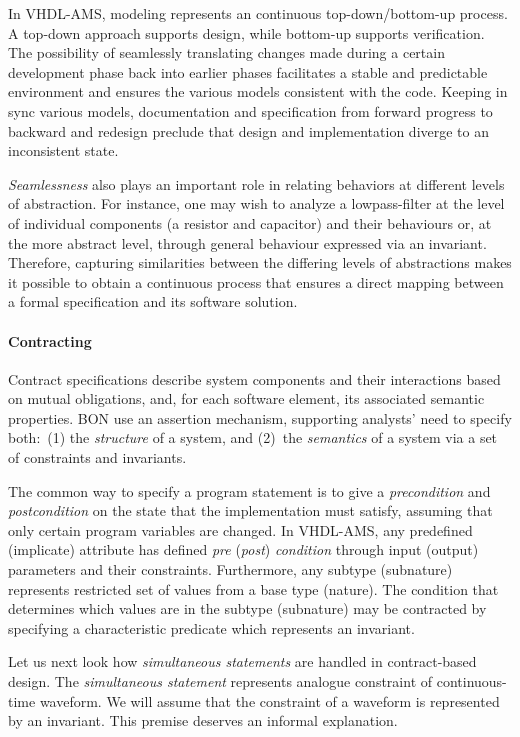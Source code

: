 \documentclass{article}
\begin{document}
In VHDL-AMS, modeling represents an continuous top-down/bottom-up
process.  A top-down approach supports design, while bottom-up
supports verification.  The possibility of seamlessly translating
changes made during a certain development phase back into earlier
phases facilitates a stable and predictable environment and ensures
the various models consistent with the code.  Keeping in sync various
models, documentation and specification from forward progress to
backward and redesign preclude that design and implementation diverge
to an inconsistent state.

\emph{Seamlessness} also plays an important role in relating behaviors
at different levels of abstraction.  For instance, one may wish to
analyze a lowpass-filter at the level of individual components (a
resistor and capacitor) and their behaviours or, at the more abstract
level, through general behaviour expressed via an invariant.
Therefore, capturing similarities between the differing levels of
abstractions makes it possible to obtain a continuous process that
ensures a direct mapping between a formal specification and its
software solution.

\paragraph{Contracting} Contract specifications describe system
components and their interactions based on mutual obligations, and,
for each software element, its associated semantic properties.  BON
use an assertion mechanism, supporting analysts' need to specify
both:~(1) the \emph{structure} of a system, and (2)~the
\emph{semantics} of a system via a set of constraints and invariants.

The common way to specify a program statement is to give a
\emph{precondition} and \emph{postcondition} on the state that the
implementation must satisfy, assuming that only certain program
variables are changed.  In VHDL-AMS, any predefined (implicate)
attribute has defined \emph{pre} (\emph{post}) \emph{condition}
through input (output) parameters and their constraints.  Furthermore,
any subtype (subnature) represents restricted set of values from a
base type (nature).  The condition that determines which values are in
the subtype (subnature) may be contracted by specifying a
characteristic predicate which represents an invariant.

Let us next look how \emph{simultaneous statements} are handled in
contract-based design.  The \emph{simultaneous statement} represents
analogue constraint of continuous-time waveform.  We will assume that
the constraint of a waveform is represented by an invariant. This
premise deserves an informal explanation.
\end{document}

